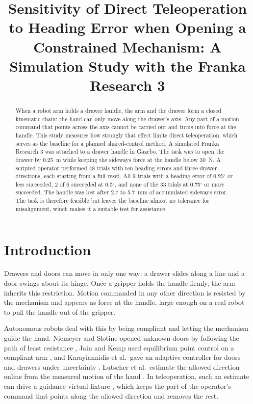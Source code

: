 \documentclass[11pt,a4paper]{article}
\title{Sensitivity of Direct Teleoperation to Heading Error when Opening a
  Constrained Mechanism: A Simulation Study with the Franka Research 3}
\author{}
\date{}
\begin{document}
\maketitle
\vspace{-3em}

\begin{abstract}
When a robot arm holds a drawer handle, the arm and the drawer form a closed kinematic chain:
the hand can only move along the drawer's axis. Any part of a motion command that points
across the axis cannot be carried out and turns into force at the handle. This study measures
how strongly that effect limits direct teleoperation, which serves as the baseline for a
planned shared-control method. A simulated Franka Research 3 was attached to a drawer handle
in Gazebo. The task was to open the drawer by 0.25~m while keeping the sideways force at the
handle below 30~N. A scripted operator performed 48 trials with ten heading errors and three
drawer directions, each starting from a full reset. All 9 trials with a heading error of
0.25$^\circ$ or less succeeded, 2 of 6 succeeded at 0.5$^\circ$, and none of the 33 trials at
0.75$^\circ$ or more succeeded. The handle was lost after 2.7 to 5.7~mm of accumulated sideways
error. The task is therefore feasible but leaves the baseline almost no tolerance for
misalignment, which makes it a suitable test for assistance.
\end{abstract}

\section{Introduction}\label{sec:intro}

Drawers and doors can move in only one way: a drawer slides along a line and a door swings
about its hinge. Once a gripper holds the handle firmly, the arm inherits this restriction.
Motion commanded in any other direction is resisted by the mechanism and appears as force at
the handle, large enough on a real robot to pull the handle out of the gripper.

Autonomous robots deal with this by being compliant and letting the mechanism guide the hand.
Niemeyer and Slotine opened unknown doors by following the path of least resistance
\cite{niemeyer1997simple}, Jain and Kemp used equilibrium point control on a compliant arm
\cite{jain2010pulling}, and Karayiannidis et al.\ gave an adaptive controller for doors and
drawers under uncertainty \cite{karayiannidis2016adaptive}. Lutscher et al.\ estimate the
allowed direction online from the measured motion of the hand \cite{lutscher2010control}. In
teleoperation, such an estimate can drive a guidance virtual fixture
\cite{rosenberg1993virtual,marayong2003spatial}, which keeps the part of the operator's
command that points along the allowed direction and removes the rest.
\end{document}
